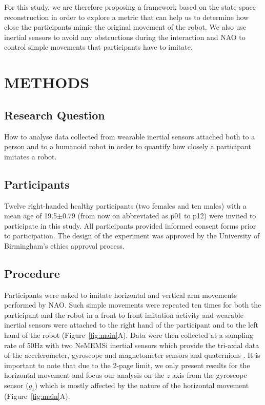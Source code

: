 \documentclass{sig-alternate-05-2015}
\begin{document}
For this study, we are therefore proposing a framework based on the state space reconstruction
in order to explore a metric that can help us to determine
how close the participants mimic the original movement of the robot.
We also use inertial sensors to avoid any obstructions during the interaction
and NAO to control simple movements that participants have to imitate.

\section{METHODS}

\subsection{Research Question}

How to analyse  data collected from wearable inertial sensors attached both
to a person and to a humanoid robot in order to quantify how closely a participant
imitates a robot.


\subsection{Participants}
Twelve right-handed healthy participants (two females and ten males)
with a mean age of 19.5$\pm$0.79 (from now on abbreviated as p01 to p12) were invited to
participate in this study.
All participants provided informed consent forms prior to participation.
The design of the experiment was approved by the University of Birmingham's ethics approval
process.


\subsection{Procedure}
Participants were asked to imitate horizontal and vertical arm movements
performed by NAO.
Such simple movements were repeated ten times for both the participant and the robot
 in a front to front imitation activity
and
 wearable inertial sensors were attached to the right hand of the participant and to the left hand of the robot
(Figure~\ref{fig:main}A).
Data were then collected at a sampling rate of 50Hz with two NeMEMSi inertial sensors
which provide the tri-axial data of the accelerometer, gyroscope and magnetometer sensors and
quaternions \cite{Comotti2014}.
It is important to note that due to the 2-page limit, we only present
results for the horizontal movement and focus our analysis on the $z$ axis from the gyroscope sensor ($g_z$)
which is mostly affected by the nature of the horizontal movement (Figure~\ref{fig:main}A).
\end{document}
